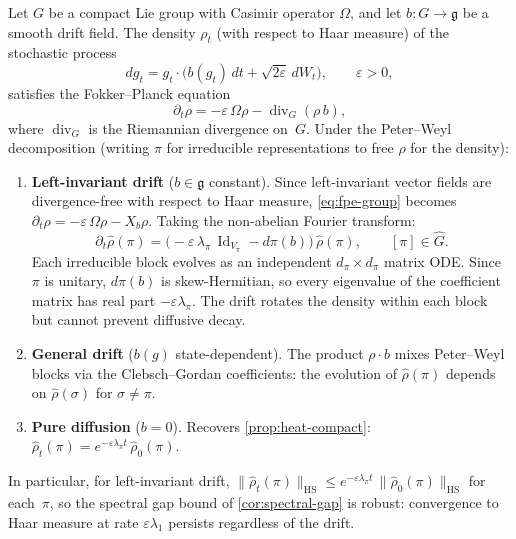 \begin{proposition}\label{prop:fpe-compact}
Let $G$ be a compact Lie group with Casimir operator $\Omega$, and let $b : G \to \mathfrak{g}$ be a smooth drift field. The density $\rho_t$ (with respect to Haar measure) of the stochastic process
\[
dg_t = g_t \cdot \bigl(b(g_t)\, dt + \sqrt{2\varepsilon}\, dW_t\bigr), \qquad \varepsilon > 0,
\]
satisfies the Fokker--Planck equation
\begin{equation}\label{eq:fpe-group}
\partial_t \rho = -\varepsilon\, \Omega\rho - \operatorname{div}_G(\rho\, b),
\end{equation}
where $\operatorname{div}_G$ is the Riemannian divergence on~$G$.
Under the Peter--Weyl decomposition (writing $\pi$ for irreducible
representations to free $\rho$ for the density):
\begin{enumerate}[label=(\roman*)]
\item \textbf{Left-invariant drift} ($b \in \mathfrak{g}$ constant). Since left-invariant vector fields are divergence-free with respect to Haar measure, \eqref{eq:fpe-group} becomes $\partial_t \rho = -\varepsilon\, \Omega\rho - X_b\rho$. Taking the non-abelian Fourier transform:
\[
\partial_t \widehat{\rho}(\pi) = \bigl(-\varepsilon\, \lambda_\pi\, \operatorname{Id}_{V_\pi} - d\pi(b)\bigr)\, \widehat{\rho}(\pi), \qquad [\pi] \in \widehat{G}.
\]
Each irreducible block evolves as an independent $d_\pi \times d_\pi$ matrix ODE. Since $\pi$ is unitary, $d\pi(b)$ is skew-Hermitian, so every eigenvalue of the coefficient matrix has real part $-\varepsilon\lambda_\pi$. The drift rotates the density within each block but cannot prevent diffusive decay.

\item \textbf{General drift} ($b(g)$ state-dependent). The product $\rho \cdot b$ mixes Peter--Weyl blocks via the Clebsch--Gordan coefficients: the evolution of $\widehat{\rho}(\pi)$ depends on $\widehat{\rho}(\sigma)$ for $\sigma \neq \pi$.

\item \textbf{Pure diffusion} ($b = 0$). Recovers \cref{prop:heat-compact}: $\widehat{\rho}_t(\pi) = e^{-\varepsilon\lambda_\pi t}\, \widehat{\rho}_0(\pi)$.
\end{enumerate}
In particular, for left-invariant drift, $\|\widehat{\rho}_t(\pi)\|_{\mathrm{HS}} \leq e^{-\varepsilon\lambda_\pi t}\, \|\widehat{\rho}_0(\pi)\|_{\mathrm{HS}}$ for each~$\pi$, so the spectral gap bound of \cref{cor:spectral-gap} is robust: convergence to Haar measure at rate $\varepsilon\lambda_1$ persists regardless of the drift.
\end{proposition}

